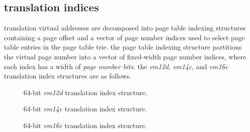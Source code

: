 \newpage
\subsection{translation indices}

translation virtual addresses are decomposed into page table indexing
structures containing a page offset and a vector of page number
indices used to select page table entries in the page table trie.
the page table indexing structure partitions the virtual page
number into a vector of fixed-width page number indices, where
each index has a width of \emph{page number bits}.
\para
the \emph{vm12d}, \emph{vm14c}, and \emph{vm16c} translation index
structures are as follows.
\\
\begin{figure}[H]
\centering
{}
\caption{64-bit \emph{vm12d} translation index structure.}
\label{fig:64-bit-vm12d-translation-index-structure}
\end{figure}

\begin{figure}[H]
\centering
{}
\caption{64-bit \emph{vm14c} translation index structure.}
\label{fig:64-bit-vm14c-translation-index-structure}
\end{figure}

\begin{figure}[H]
\centering
{}
\caption{64-bit \emph{vm16c} translation index structure.}
\label{fig:64-bit-vm16c-translation-index-structure}
\end{figure}

